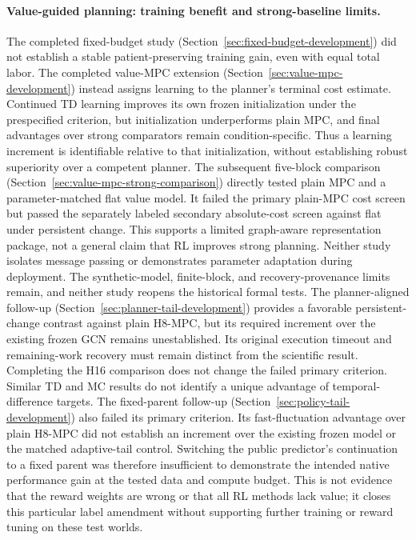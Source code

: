 \documentclass[preprint,review,12pt]{elsarticle}
\begin{document}
\paragraph{Value-guided planning: training benefit and strong-baseline limits.}
The completed fixed-budget study (Section~\ref{sec:fixed-budget-development})
did not establish a stable patient-preserving training gain, even with equal
total labor. The completed value-MPC extension
(Section~\ref{sec:value-mpc-development}) instead assigns learning to the
planner's terminal cost estimate. Continued TD learning improves its own frozen
initialization under the prespecified criterion, but initialization underperforms
plain MPC, and final advantages over strong comparators remain condition-specific.
Thus a learning increment is identifiable relative to that initialization,
without establishing robust superiority over a competent planner. The subsequent
five-block comparison (Section~\ref{sec:value-mpc-strong-comparison}) directly
tested plain MPC and a parameter-matched flat value model. It failed the primary
plain-MPC cost screen but passed the separately labeled secondary absolute-cost
screen against flat under persistent change. This supports a limited graph-aware
representation package, not a general claim that RL improves strong planning.
Neither study isolates message passing or demonstrates parameter adaptation
during deployment. The synthetic-model, finite-block, and recovery-provenance
limits remain, and neither study reopens the historical formal tests.
The planner-aligned follow-up (Section~\ref{sec:planner-tail-development})
provides a favorable persistent-change contrast against plain H8-MPC, but its
required increment over the existing frozen GCN remains unestablished. Its
original execution timeout and remaining-work recovery must remain distinct
from the scientific result. Completing the H16 comparison does not change the
failed primary criterion. Similar TD and MC results do not identify a
unique advantage of temporal-difference targets.
The fixed-parent follow-up (Section~\ref{sec:policy-tail-development}) also failed
its primary criterion. Its fast-fluctuation advantage over plain H8-MPC did not
establish an increment over the existing frozen model or the matched adaptive-tail
control. Switching the public predictor's continuation to a fixed parent
was therefore insufficient to demonstrate the intended native performance gain
at the tested data and compute budget. This is not evidence that the reward
weights are wrong or that all RL methods lack value; it closes this particular
label amendment without supporting further training or reward tuning on these
test worlds.
\end{document}
